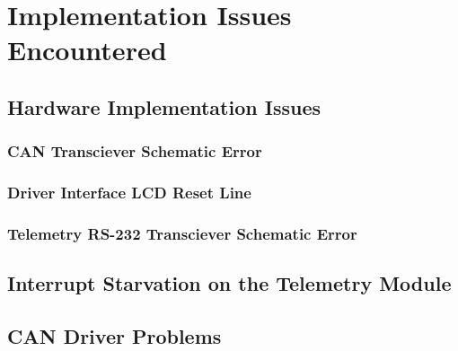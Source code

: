 \section{Implementation Issues Encountered}


\subsection{Hardware Implementation Issues}


\subsubsection{CAN Transciever Schematic Error}


\subsubsection{Driver Interface LCD Reset Line}


\subsubsection{Telemetry RS-232 Transciever Schematic Error}


\subsection{Interrupt Starvation on the Telemetry Module}


\subsection{CAN Driver Problems}